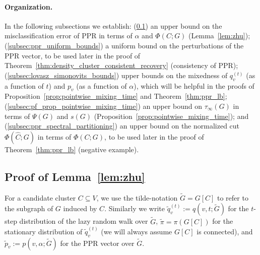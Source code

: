 \documentclass{article}
\newcommand{\1}{\mathbf{1}}
\newcommand{\wt}[1]{\widetilde{#1}}
\newcommand{\wh}[1]{\widehat{#1}}
\theoremstyle{definition}
\theoremstyle{remark}
\begin{document}
\paragraph{Organization.} In the following subsections we establish: (\ref{subsec:pf_lem_zhu}) an upper bound on the misclassification error of PPR in terms of $\alpha$ and $\Phi(C;G)$ (Lemma~\ref{lem:zhu}); (\ref{subsec:ppr_uniform_bounds}) a uniform bound on the perturbations of the PPR vector, to be used later in the proof of Theorem~\ref{thm:density_cluster_consistent_recovery} (consistency of PPR);  (\ref{subsec:lovasz_simonovits_bounds}) upper bounds on the mixedness of $q_v^{(t)}$ (as a function of $t$) and $p_v$ (as a function of $\alpha$), which will be helpful in the proofs of Proposition~\ref{prop:pointwise_mixing_time} and Theorem~\ref{thm:ppr_lb}; (\ref{subsec:pf_prop_pointwise_mixing_time}) an upper bound on $\tau_{\infty}(G)$ in terms of $\Psi(G)$ and $s(G)$ (Proposition~\ref{prop:pointwise_mixing_time}); and (\ref{subsec:ppr_spectral_partitioning}) an upper bound on the normalized cut $\Phi(\wh{C};G)$ in terms of $\Phi(C;G)$, to be used later in the proof of Theorem~\ref{thm:ppr_lb} (negative example). 

\subsection{Proof of Lemma~\ref{lem:zhu}}
\label{subsec:pf_lem_zhu}
For a candidate cluster $C \subseteq V$, we use the tilde-notation $\wt{G} = G[C]$ to refer to the subgraph of $G$ induced by $C$. Similarly we write $\wt{q}_v^{(t)} := q(v,t;\wt{G})$ for the $t$-step distribution of the lazy random walk over $\wt{G}$, $\wt{\pi} = \pi(G[C])$ for the stationary distribution of $\wt{q}_v^{(t)}$ (we will always assume $G[C]$ is connected), and $\wt{p}_v := p(v,\alpha;\wt{G})$ for the PPR vector over $\wt{G}$.
\end{document}
